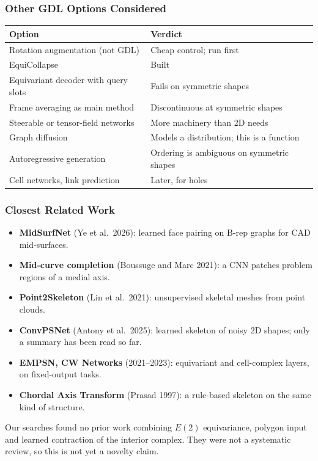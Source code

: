 \begin{frame}[fragile]\frametitle{Other GDL Options Considered}
\begin{center}
\small
\begin{tabular}{@{}ll@{}}
\toprule
\textbf{Option} & \textbf{Verdict} \\
\midrule
Rotation augmentation (not GDL) & Cheap control; run first \\
EquiCollapse & Built \\
Equivariant decoder with query slots & Fails on symmetric shapes \\
Frame averaging as main method & Discontinuous at symmetric shapes \\
Steerable or tensor-field networks & More machinery than 2D needs \\
Graph diffusion & Models a distribution; this is a function \\
Autoregressive generation & Ordering is ambiguous on symmetric shapes \\
Cell networks, link prediction & Later, for holes \\
\bottomrule
\end{tabular}
\end{center}
\end{frame}

\begin{frame}[fragile]\frametitle{Closest Related Work}
\begin{itemize}
\item \textbf{MidSurfNet} (Ye et al.\ 2026): learned face pairing on B-rep graphs for CAD mid-surfaces.
\item \textbf{Mid-curve completion} (Boussuge and Marc 2021): a CNN patches problem regions of a medial axis.
\item \textbf{Point2Skeleton} (Lin et al.\ 2021): unsupervised skeletal meshes from point clouds.
\item \textbf{ConvPSNet} (Antony et al.\ 2025): learned skeleton of noisy 2D shapes; only a summary has been read so far.
\item \textbf{EMPSN, CW Networks} (2021--2023): equivariant and cell-complex layers, on fixed-output tasks.
\item \textbf{Chordal Axis Transform} (Prasad 1997): a rule-based skeleton on the same kind of structure.
\end{itemize}

\vspace{2pt}
{\footnotesize Our searches found no prior work combining $E(2)$ equivariance, polygon input and learned contraction of the interior complex. They were not a systematic review, so this is not yet a novelty claim.}
\end{frame}
